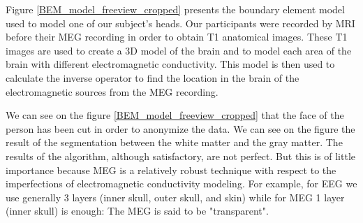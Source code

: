Figure \ref{BEM_model_freeview_cropped} presents the boundary element model used to model one of our subject's heads. Our participants were recorded by MRI before their MEG recording in order to obtain T1 anatomical images. These T1 images are used to create a 3D model of the brain and to model each area of the brain with different electromagnetic conductivity. This model is then used to calculate the inverse operator to find the location in the brain of the electromagnetic sources from the MEG recording.

We can see on the figure \ref{BEM_model_freeview_cropped} that the face of the person has been cut in order to anonymize the data.  We can see on the figure the result of the segmentation between the white matter and the gray matter. The results of the algorithm, although satisfactory, are not perfect. But this is of little importance because MEG is a relatively robust technique with respect to the imperfections of electromagnetic conductivity modeling. For example, for EEG we use generally 3 layers (inner skull, outer skull, and skin) while for MEG 1 layer (inner skull) is enough: The MEG is said to be "transparent".


